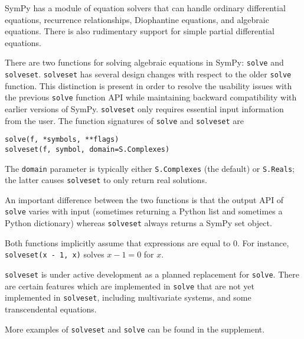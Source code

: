 SymPy has a module of equation solvers that can handle ordinary differential
equations, recurrence relationships, Diophantine equations, and algebraic
equations. There is also
rudimentary support for simple partial differential equations.

There are two functions for solving algebraic equations in SymPy:
\texttt{solve} and \texttt{solveset}.
\texttt{solveset} has several design changes with respect to the older
\texttt{solve} function. This distinction is present in order to resolve the
usability issues with the
previous \texttt{solve} function API while maintaining backward compatibility
with earlier versions of SymPy.
\texttt{solveset} only requires essential input information from the user.
The function signatures of \texttt{solve} and \texttt{solveset} are
\begin{verbatim}
solve(f, *symbols, **flags)
solveset(f, symbol, domain=S.Complexes)
\end{verbatim}
The \texttt{domain} parameter is typically either \texttt{S.Complexes} (the
default) or \texttt{S.Reals}; the latter causes \texttt{solveset} to only return real solutions.

An important difference between the two functions is that the output API of \texttt{solve}
varies with input (sometimes returning a Python list and sometimes a Python dictionary) whereas
\texttt{solveset} always returns
a SymPy set object.

Both functions implicitly assume that expressions are equal to 0. For
instance, \texttt{solveset(x - 1, x)} solves $x - 1 = 0$ for $x$.

\texttt{solveset} is under active development as a planned replacement for
\texttt{solve}. There are certain features which are implemented in
\texttt{solve} that are not yet implemented in \texttt{solveset}, including
multivariate systems, and some transcendental equations.

More examples of \texttt{solveset} and \texttt{solve} can be found in the
supplement.